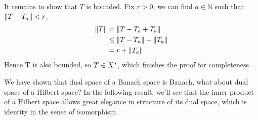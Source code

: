 \begin{proposition}
	It remains to show that $T$ is bounded. Fix $r>0$, we can find $a\in\mathbb{N}$ such that $\left\|{T-T_a}\right\|<r$,
	\begin{equation}
		\begin{split}
			\left\|{T}\right\|&=\left\|{T-T_a+T_a}\right\|\\
			&\leq\left\|{T-T_a}\right\|+\left\|{T_a}\right\|\\
			&=r+\left\|{T_a}\right\|
		\end{split}
	\end{equation}
	Hence T is also bounded, so $T\in {X}^*$, which finishes the proof for completeness.
\end{proposition}



We have shown that dual space of a Banach space is Banach, what about dual space of a Hilbert space? In the following result, we'll see that the inner product of a Hilbert space allows great elegance in structure of its dual space, which is identity in the sense of isomorphism.

